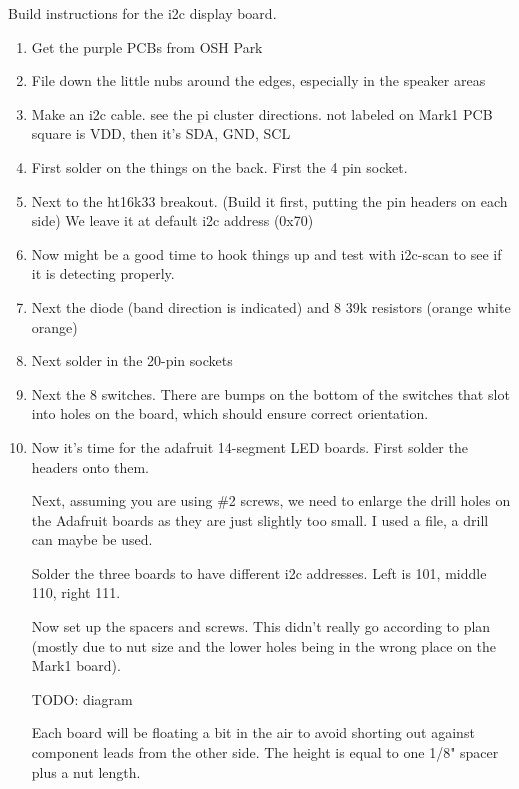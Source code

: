 \documentclass[11pt]{article}
\begin{document}
Build instructions for the i2c display board.

\begin{enumerate}
\item	Get the purple PCBs from OSH Park
\item	File down the little nubs around the edges, especially in the speaker
	areas
\item	Make an i2c cable.  see the pi cluster directions.
	not labeled on Mark1 PCB
	square is VDD, then it's SDA, GND, SCL

\item	First solder on the things on the back.  First the 4 pin socket.

\item	Next to the ht16k33 breakout.  (Build it first, putting the pin
	headers on each side)  We leave it at default i2c address (0x70)

\item	Now might be a good time to hook things up and test with i2c-scan
	to see if it is detecting properly.

\item	Next the diode (band direction is indicated)
	and 8 39k  resistors (orange white orange)

\item	Next solder in the 20-pin sockets

\item	Next the 8 switches.  There are bumps on the bottom of the
	switches that slot into holes on the board, which should
	ensure correct orientation.

\item	Now it's time for the adafruit 14-segment LED boards.
	First solder the headers onto them.

	Next, assuming you are using \#2 screws, we need to enlarge the
	drill holes on the Adafruit boards as they are just slightly too
	small.  I used a file, a drill can maybe be used.

	Solder the three boards to have different i2c addresses.
	Left is 101, middle 110, right 111.

	Now set up the spacers and screws.  This didn't really go according
	to plan (mostly due to nut size and the lower holes being in the
	wrong place on the Mark1 board).

	TODO: diagram

	Each board will be floating a bit in the air to avoid shorting out
	against component leads from the other side.  The height is equal
	to one 1/8" spacer plus a nut length.  


\end{enumerate}
\end{document}
